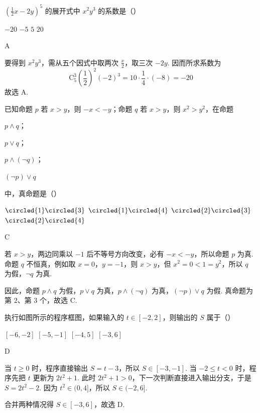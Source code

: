 \begin{problem}
\(\left(\frac{1}{2}x - 2y\right)^5\) 的展开式中 \(x^2 y^3\) 的系数是（\quad）

\choices
    {\(-20\)}
    {\(-5\)}
    {\(5\)}
    {\(20\)}
\begin{answer}
A
\end{answer}

\begin{solution}
要得到 \(x^2y^3\)，需从五个因式中取两次 \(\frac{x}{2}\)，取三次 \(-2y\). 因而所求系数为
\[
\mathrm C_5^3\left(\frac{1}{2}\right)^2(-2)^3
=10\cdot\frac{1}{4}\cdot(-8)=-20
\]
故选 A.
\end{solution}
\end{problem}

\begin{problem}
已知命题 \(p\) 若 \(x > y\)，则 \(-x < -y\)；命题 \(q\) 若 \(x > y\)，则 \(x^2 > y^2\)，在命题

\begin{circlelist}
\item \(p \wedge q\)；
\item \(p \vee q\)；
\item \(p \wedge (\neg q)\)；
\item \((\neg p) \vee q\)
\end{circlelist}

中，真命题是（\quad）

\choices
    {\(\circled{1}\circled{3}\)}
    {\(\circled{1}\circled{4}\)}
    {\(\circled{2}\circled{3}\)}
    {\(\circled{2}\circled{4}\)}
\begin{answer}
C
\end{answer}

\begin{solution}
若 \(x>y\)，两边同乘以 \(-1\) 后不等号方向改变，必有 \(-x<-y\)，所以命题 \(p\) 为真. 命题 \(q\) 不恒真，例如取 \(x=0\)，\(y=-1\)，则 \(x>y\)，但 \(x^2=0<1=y^2\)，所以 \(q\) 为假，\(\neg q\) 为真.

因此，命题 \(p\wedge q\) 为假，\(p\vee q\) 为真，\(p\wedge(\neg q)\) 为真，\((\neg p)\vee q\) 为假. 真命题为第 \(2\)、第 \(3\) 个，故选 C.
\end{solution}
\end{problem}

\begin{problem}
执行如图所示的程序框图，如果输入的 \(t \in [-2, 2]\)，则输出的 \(S\) 属于（\quad）


\choices
    {\([-6, -2]\)}
    {\([-5, -1]\)}
    {\([-4, 5]\)}
    {\([-3, 6]\)}
\begin{answer}
D
\end{answer}

\begin{solution}
当 \(t\geqslant0\) 时，程序直接输出 \(S=t-3\)，所以 \(S\in[-3,-1]\). 当 \(-2\leqslant t<0\) 时，程序先把 \(t\) 更新为 \(2t^2+1\). 此时 \(2t^2+1>0\)，下一次判断直接进入输出分支，于是 \(S=2t^2-2\). 因为 \(t^2\in(0,4]\)，所以 \(S\in(-2,6]\).

合并两种情况得 \(S\in[-3,6]\)，故选 D.
\end{solution}
\end{problem}

